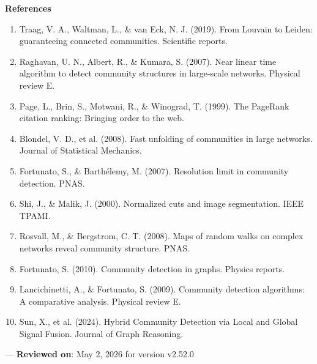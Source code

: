 \textbf{References}
\begin{enumerate}
\item Traag, V. A., Waltman, L., \& van Eck, N. J. (2019). From Louvain to Leiden: guara\-nteeing connected communities. Scientific reports.
\item Raghavan, U. N., Albert, R., \& Kumara, S. (2007). Near linear time algorithm to detect community structures in large-scale networks. Physical review E.
\item Page, L., Brin, S., Motwani, R., \& Winograd, T. (1999). The PageRank citation ranking: Bringing order to the web.
\item Blondel, V. D., et al. (2008). Fast unfolding of communities in large networks. Journal of Statistical Mechanics.
\item Fortunato, S., \& Barthélemy, M. (2007). Resolution limit in community detection. PNAS.
\item Shi, J., \& Malik, J. (2000). Normalized cuts and image segme\-ntation. IEEE TPAMI.
\item Rosvall, M., \& Bergstrom, C. T. (2008). Maps of random walks on complex networks reveal community structure. PNAS.
\item Fortunato, S. (2010). Community detection in graphs. Physics reports.
\item Lancic\-hinetti, A., \& Fortunato, S. (2009). Community detection algorithms: A comparative analysis. Physical review E.
\item Sun, X., et al. (2024). Hybrid Community Detection via Local and Global Signal Fusion. Journal of Graph Reasoning.

\end{enumerate}
---
\textbf{Reviewed on}: May 2, 2026 for version v2.52.0
